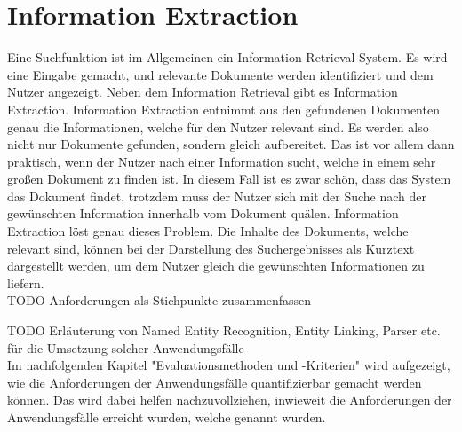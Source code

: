 \section{Information Extraction}
Eine Suchfunktion ist im Allgemeinen ein Information Retrieval System.
Es wird eine Eingabe gemacht, und relevante Dokumente werden identifiziert und dem Nutzer angezeigt.
Neben dem Information Retrieval gibt es Information Extraction.
Information Extraction entnimmt aus den gefundenen Dokumenten genau die Informationen, welche für den Nutzer relevant sind.
Es werden also nicht nur Dokumente gefunden, sondern gleich aufbereitet.
Das ist vor allem dann praktisch, wenn der Nutzer nach einer Information sucht, welche in einem sehr großen Dokument zu finden ist.
In diesem Fall ist es zwar schön, dass das System das Dokument findet, trotzdem muss der Nutzer sich mit der Suche nach der gewünschten Information innerhalb vom Dokument quälen.
Information Extraction löst genau dieses Problem.
Die Inhalte des Dokuments, welche relevant sind, können bei der Darstellung des Suchergebnisses als Kurztext dargestellt werden, um dem Nutzer gleich die gewünschten Informationen zu liefern.\\

TODO Anforderungen als Stichpunkte zusammenfassen

TODO Erläuterung von Named Entity Recognition, Entity Linking, Parser etc. für die Umsetzung solcher Anwendungsfälle\\

Im nachfolgenden Kapitel "Evaluationsmethoden und -Kriterien" wird aufgezeigt, wie die Anforderungen der Anwendungsfälle quantifizierbar gemacht werden können.
Das wird dabei helfen nachzuvollziehen, inwieweit die Anforderungen der Anwendungsfälle erreicht wurden, welche genannt wurden.
